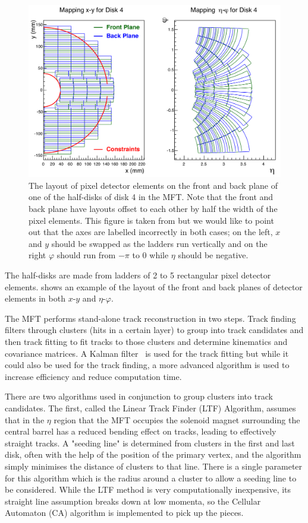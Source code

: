 \begin{figure}[h]
    \begin{center}
        \includegraphics[width=.8\textwidth]{Figs/MFT_Disk4_mapping.png}
        \caption{The layout of pixel detector elements on the front and back plane of one of the half-disks of disk 4 in the MFT. Note that the front and back plane have layouts offset to each other by half the width of the pixel elements. This figure is taken from \cite[fig.~6.1]{MFT_TDR} but we would like to point out that the axes are labelled incorrectly in both cases; on the left, $x$ and $y$ should be swapped as the ladders run vertically and on the right $\varphi$ should run from $-\pi$ to 0 while $\eta$ should be negative.}
        \label{fig:MFT_Disk4_mapping}
    \end{center}
\end{figure}

The half-disks are made from ladders of 2 to 5 rectangular pixel detector elements.  shows an example of the layout of the front and back planes of detector elements in both $x$-$y$ and $\eta$-$\varphi$. 

The MFT performs stand-alone track reconstruction in two steps. Track finding filters through clusters (hits in a certain layer) to group into track candidates and then track fitting to fit tracks to those clusters and determine kinematics and covariance matrices. A Kalman filter~\cite{Kalman} is used for the track fitting but while it could also be used for the track finding, a more advanced algorithm is used to increase efficiency and reduce computation time. 

There are two algorithms used in conjunction to group clusters into track candidates. The first, called the Linear Track Finder (LTF) Algorithm, assumes that in the $\eta$ region that the MFT occupies the solenoid magnet surrounding the central barrel has a reduced bending effect on tracks, leading to effectively straight tracks. A "seeding line" is determined from clusters in the first and last disk, often with the help of the position of the primary vertex, and the algorithm simply minimises the distance of clusters to that line. There is a single parameter for this algorithm which is the radius around a cluster to allow a seeding line to be considered. While the LTF method is very computationally inexpensive, its straight line assumption breaks down at low momenta, so the Cellular Automaton (CA) algorithm is implemented to pick up the pieces.

